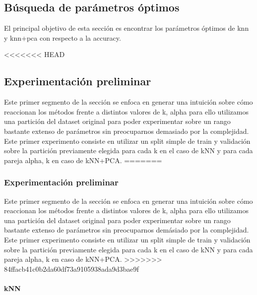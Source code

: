 
\subsection{Búsqueda de parámetros óptimos }

El principal objetivo de esta sección es encontrar los parámetros óptimos de knn y knn+pca con respecto a la accuracy. 

<<<<<<< HEAD
\subsection{Experimentación preliminar}
Este primer segmento de la sección se enfoca en generar una intuición sobre cómo reaccionan los métodos frente a distintos valores de k, alpha para ello utilizamos una partición del dataset original para poder experimentar sobre un rango bastante extenso de parámetros sin preocuparnos demasiado por la complejidad. Este primer experimento consiste en utilizar un split simple de train y validación sobre la partición previamente elegida para cada k en el caso de kNN y para cada pareja alpha, k en caso de kNN+PCA. 
=======
\subsubsection{Experimentación preliminar}
Este primer segmento de la sección se enfoca en generar una intuición sobre cómo reaccionan los métodos frente a distintos valores de k, alpha para ello utilizamos una partición del dataset original para poder experimentar sobre un rango bastante extenso de parámetros sin preocuparnos demásiado por la complejidad. Este primer experimento consiste en utilizar un split simple de train y validación sobre la partición previamente elegida para cada k en el caso de kNN y para cada pareja alpha, k en caso de kNN+PCA. 
>>>>>>> 84ffacb41c0b2da60df73a9105938ada9d3bae9f

\paragraph{kNN}

